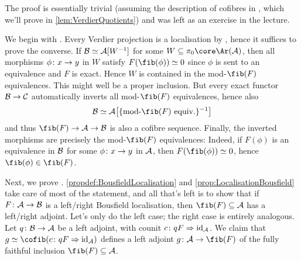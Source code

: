 \documentclass[a4paper, 10pt, oneside, DIV=9, chapterprefix=true, numbers=enddot,bibliography=totoc]{scrbook}
\begin{document}
\begin{proof*}
	The proof is essentially trivial (assuming the description of cofibres in , which we'll prove in \cref{lem:VerdierQuotients}) and was left as an exercise in the lecture.
	
	We begin with . Every Verdier projection is a localisation by , hence it suffices to prove the converse. If $\mathcal{B}\simeq \mathcal{A}[W^{-1}]$ for some $W\subseteq \pi_0\core\Ar(\Aa)$, then all morphisms $\phi\colon x\morphism y$ in $W$ satisfy $F(\fib(\phi))\simeq 0$ since $\phi$ is sent to an equivalence and $F$ is exact. Hence $W$ is contained in the mod-$\fib(F)$ equivalences. This might well be a proper inclusion. But every exact functor $\Bb\morphism \Cc$ automatically inverts all mod-$\fib(F)$ equivalences, hence also
	\begin{equation*}
		\Bb\simeq \Aa\big[\{\text{mod-$\fib(F)$ equiv.}\}^{-1}\big]
	\end{equation*}
	and thus $\fib(F)\morphism \Aa\morphism \Bb$ is also a cofibre sequence. Finally, the inverted morphisms are precisely the mod-$\fib(F)$ equivalences: Indeed, if $F(\phi)$ is an equivalence in $\mathcal{B}$ for some $\phi\colon x\morphism y$ in $\mathcal{A}$, then $F(\fib(\phi))\simeq 0$, hence $\fib(\phi)\in \fib(F)$.
	
	Next, we prove . \cref{propdef:BousfieldLocalisation} and \cref{prop:LocalisationBousfield} take care of most of the statement, and all that's left is to show that if $F\colon \Aa\morphism \Bb$ is a left/right Bousfield localisation, then $\fib(F)\subseteq \Aa$ has a left/right adjoint. Let's only do the left case; the right case is entirely analogous. Let $q\colon \Bb\morphism \Aa$ be a left adjoint, with counit $c\colon qF\Rightarrow \operatorname{id}_{\mathcal{A}}$. We claim that $g\simeq  \cofib(c\colon qF\Rightarrow \id_\Aa)$ defines a left adjoint $g\colon \Aa\morphism \fib(F)$ of the fully faithful inclusion $\fib(F)\subseteq \Aa$.
	

\end{proof*}
\end{document}
